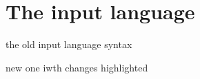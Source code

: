 \chapter{The input language}
\label{ch:impl}

the old input language syntax

new one iwth changes highlighted

